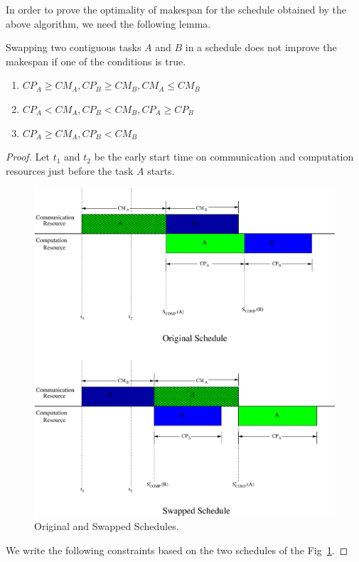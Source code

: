 \documentclass[sigconf]{acmart}
\begin{document}
In order to prove the optimality of makespan for the schedule obtained by the above algorithm, we need the following lemma.

\begin{lemma}\label{lemma:swappingOfTasks}
	Swapping two contiguous tasks $A$ and $B$ in a schedule does not improve the makespan if one of the conditions is true.
	\begin{enumerate}[label=\roman*)]
		\item  $CP_A \ge CM_A, CP_B \ge CM_B, CM_A \le CM_B$
		\item $CP_A < CM_A, CP_B < CM_B, CP_A \ge CP_B$
		\item $CP_A \ge CM_A, CP_B < CM_B$
	\end{enumerate}
\end{lemma}
\begin{proof}
	Let $t_1$ and $t_2$ be the early start time on communication and computation resources just before the task $A$ starts.
	
	\begin{figure}[htb]
		\centering
		\includegraphics[scale=0.35]{Figs/original_swapped_schedules}
		\caption{ \label{fig:bothSchedule} Original and Swapped Schedules.}
	\end{figure}
	We write the following constraints based on the two schedules of the Fig~\ref{fig:bothSchedule}.
	

\end{proof}
\end{document}
